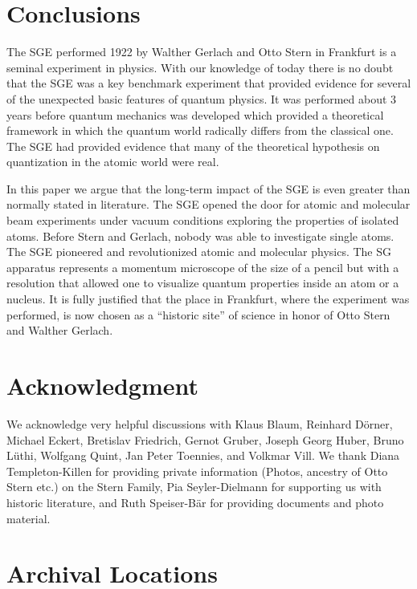 \documentclass[12pt]{article}
\begin{document}
\section{Conclusions}

The SGE performed 1922 by Walther Gerlach and Otto Stern in Frankfurt is a seminal experiment in physics. With our knowledge of today there is no doubt that the SGE was a key benchmark experiment that provided evidence for several of the unexpected basic features of quantum physics. It was performed about 3 years before quantum mechanics was developed which provided a theoretical framework in which the quantum world radically differs from the classical one. The SGE had provided evidence that many of the theoretical hypothesis on quantization in the atomic world were real. 

In this paper we argue that the long-term impact of the SGE is even greater than normally stated in literature. The SGE opened the door for atomic and molecular beam experiments under vacuum conditions exploring the properties of isolated atoms. Before Stern and Gerlach, nobody was able to investigate single atoms. The SGE pioneered and revolutionized atomic and molecular physics. The SG apparatus represents a momentum microscope of the size of a pencil but with a resolution that allowed one to visualize quantum properties inside an atom or a nucleus. It is fully justified that the place in Frankfurt, where the experiment was performed, is now chosen as a ``historic site'' of science in honor of Otto Stern and Walther Gerlach. 

\section*{Acknowledgment}

We acknowledge very helpful discussions with Klaus Blaum, Reinhard Dörner, Michael Eckert, Bretislav Friedrich, Gernot Gruber, Joseph Georg Huber, Bruno Lüthi, Wolfgang Quint, Jan Peter Toennies, and Volkmar Vill. We thank Diana Templeton-Killen for providing private information (Photos, ancestry of Otto Stern etc.) on the Stern Family, Pia Seyler-Dielmann for supporting us with historic literature, and Ruth Speiser-Bär for providing documents and photo material.

\section*{Archival Locations}
\end{document}
